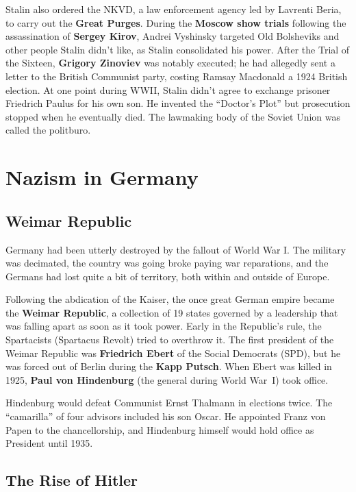Stalin also ordered the NKVD, a law enforcement agency led by Lavrenti Beria,
to carry out the \textbf{Great Purges}.
During the \textbf{Moscow show trials} following the assassination of \textbf{Sergey Kirov},
Andrei Vyshinsky targeted Old Bolsheviks and other people Stalin didn't like, as Stalin consolidated his power.
After the Trial of the Sixteen, \textbf{Grigory Zinoviev} was notably executed;
he had allegedly sent a letter to the British Communist party, costing Ramsay Macdonald a 1924 British election.
At one point during WWII, Stalin didn't agree to exchange prisoner Friedrich Paulus for his own son.
He invented the ``Doctor's Plot'' but prosecution stopped when he eventually died.
The lawmaking body of the Soviet Union was called the politburo.

\section{Nazism in Germany}

\subsection*{Weimar Republic}

Germany had been utterly destroyed by the fallout of World War I\@.
The military was decimated, the country was going broke paying war reparations,
and the Germans had lost quite a bit of territory, both within and outside of Europe.

Following the abdication of the Kaiser,
the once great German empire became the \textbf{Weimar Republic},
a collection of 19 states governed by a leadership that was falling apart as soon as it took power.
Early in the Republic's rule, the Spartacists (Spartacus Revolt) tried to overthrow it.
The first president of the Weimar Republic was \textbf{Friedrich Ebert} of the Social Democrats (SPD),
but he was forced out of Berlin during the \textbf{Kapp Putsch}.
When Ebert was killed in 1925, \textbf{Paul von Hindenburg} (the general during World War~I) took office.

Hindenburg would defeat Communist Ernst Thalmann in elections twice.
The ``camarilla'' of four advisors included his son Oscar.
He appointed Franz von Papen to the chancellorship,
and Hindenburg himself would hold office as President until 1935.

\subsection*{The Rise of Hitler}

